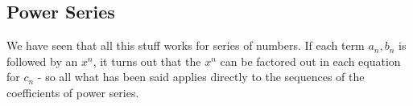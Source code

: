 \subsection{Power Series}
We have seen that all this stuff works for series of numbers. If each term $a_n, b_n$ is followed by an $x^n$, it turns out that the $x^n$ can be factored out in each equation for $c_n$ - so all what has been said applies directly to the sequences of the coefficients of power series.





%
















